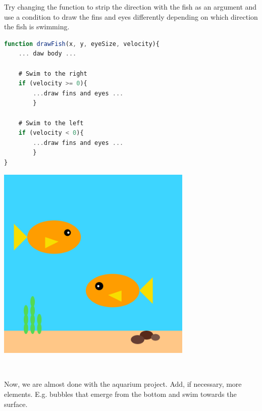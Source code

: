 \begin{exercisebox}[adjusted title=Change appearance ]
Try changing the  function to strip the direction
with the fish as an argument and use a condition to draw the fins and
eyes differently depending on which direction the fish is swimming.

\begin{minipage}{0.60\linewidth}
\begin{lstlisting}[language=JavaScript]
function drawFish(x, y, eyeSize, velocity){
    ... daw body ...

    # Swim to the right
    if (velocity >= 0){
        ...draw fins and eyes ...
        }

    # Swim to the left
    if (velocity < 0){
        ...draw fins and eyes ...
        }
}
\end{lstlisting}

\end{minipage}
\begin{minipage}{0.40\linewidth}
\includegraphics[width=0.70\textwidth]{illustrationer/fisk-begge-retninger.png}
\end{minipage}
~
\end{exercisebox}


\begin{exercisebox}[adjusted title=Finish the aquarium project ]
Now, we are almost done with the aquarium project. Add, if necessary, more elements. E.g. bubbles that emerge from the bottom and swim towards the surface.
\end{exercisebox}

